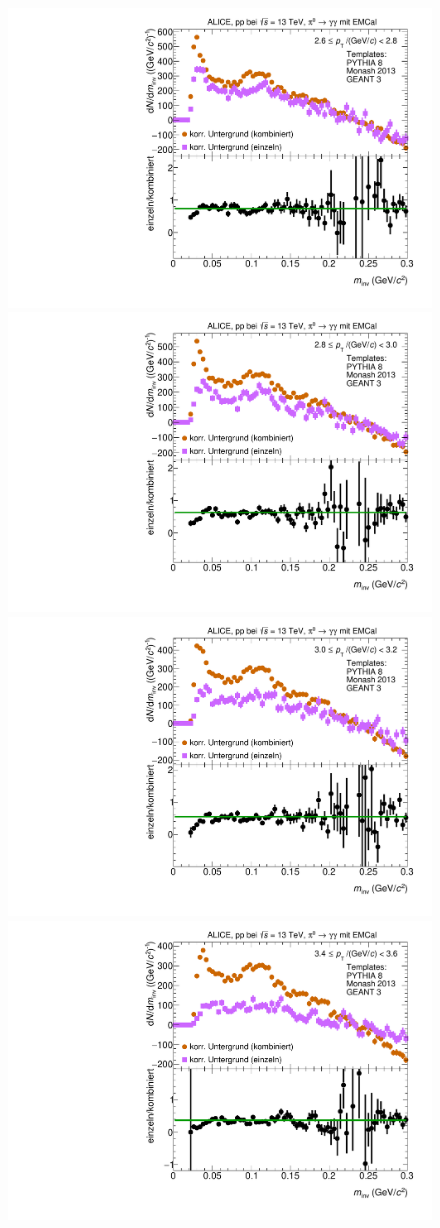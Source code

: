 \begin{figure}[t]
\centering
\begin{multicols}{2}
    \includegraphics[width=.65\linewidth]{Anhang/BackgroundWithRatio07_Data_2016.pdf}\par 
    \includegraphics[width=.65\linewidth]{Anhang/BackgroundWithRatio08_Data_2016.pdf}\par 
\end{multicols}
\begin{multicols}{2}
    \includegraphics[width=.65\linewidth]{Anhang/BackgroundWithRatio09_Data_2016.pdf}\par
    \includegraphics[width=.65\linewidth]{Anhang/BackgroundWithRatio11_Data_2016.pdf}\par

\end{multicols}
\end{figure}
